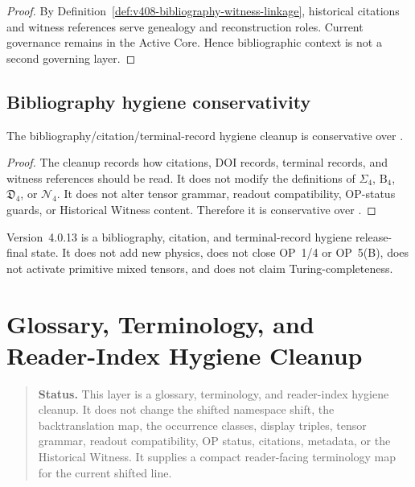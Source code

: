 \begin{proof}
By Definition~\ref{def:v408-bibliography-witness-linkage}, historical citations
and witness references serve genealogy and reconstruction roles. Current
governance remains in the Active Core. Hence bibliographic context is not a
second governing layer.
\end{proof}

\subsection{Bibliography hygiene conservativity}
\label{subsec:v408-bibliography-hygiene-conservativity}

\begin{theorem}
\label{thm:v408-bibliography-citation-hygiene-conservativity}
The  bibliography/citation/terminal-record hygiene cleanup is conservative
over .
\end{theorem}

\begin{proof}
The cleanup records how citations, DOI records, terminal records, and witness
references should be read. It does not modify the definitions of $\Sigma_4$,
$\mathrm B_4$, $\mathfrak D_4$, or $\mathcal N_4$. It does not alter tensor
grammar, readout compatibility, OP-status guards, or Historical Witness
content. Therefore it is conservative over .
\end{proof}

\begin{remark}
\label{rem:v408-non-claim}
Version~4.0.13 is a bibliography, citation, and terminal-record hygiene
release-final state. It does not add new physics, does not close OP~1/4 or OP~5(B),
does not activate primitive mixed tensors, and does not claim
Turing-completeness.
\end{remark}



\clearpage
\section{ Glossary, Terminology, and Reader-Index Hygiene Cleanup}
\label{sec:v409-glossary-terminology-reader-index-hygiene-cleanup}

\begin{quote}\small
\noindent\textbf{Status.}
This  layer is a glossary, terminology, and reader-index hygiene cleanup.
It does not change the shifted namespace shift, the backtranslation map, the
occurrence classes, display triples, tensor grammar, readout compatibility, OP
status, citations, metadata, or the Historical Witness. It supplies a compact
reader-facing terminology map for the current shifted line.
\end{quote}

